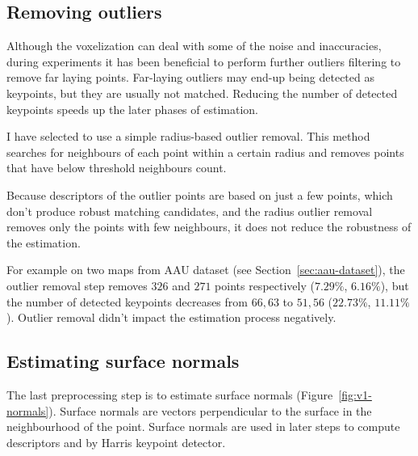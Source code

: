 \subsection{Removing outliers}
\label{sec:outlier-removal}

Although the voxelization can deal with some of the noise and inaccuracies, during experiments it has been beneficial to perform further outliers filtering to remove far laying points. Far-laying outliers may end-up being detected as keypoints, but they are usually not matched. Reducing the number of detected keypoints speeds up the later phases of estimation.

I have selected to use a simple radius-based outlier removal. This method searches for neighbours of each point within a certain radius and removes points that have below threshold neighbours count.

Because descriptors of the outlier points are based on just a few points, which don't produce robust matching candidates, and the radius outlier removal removes only the points with few neighbours, it does not reduce the robustness of the estimation.

For example on two maps from \gls{AAU} dataset (see Section~\ref{sec:aau-dataset}), the outlier removal step removes $326$ and $271$ points respectively ($7.29\%$, $6.16\%$), but the number of detected keypoints decreases from $66, 63$ to $51, 56$ ($22.73\%$, $11.11\%$). Outlier removal didn't impact the estimation process negatively.

\subsection{Estimating surface normals}
\label{sec:normal-estimation}

The last preprocessing step is to estimate surface normals (Figure~\ref{fig:v1-normals}). Surface normals are vectors perpendicular to the surface in the neighbourhood of the point. Surface normals are used in later steps to compute descriptors and by Harris keypoint detector.

